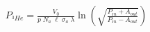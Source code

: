 


\begin{eqnarray*}
  P_{^3He} = \frac{V_0}{p \; N_a \; \ell \; \sigma_a \; \lambda} \ln \left(\sqrt{\frac{P_{in} + A_{out}}{P_{in}-A_{out}}} \right)
\end{eqnarray*}

